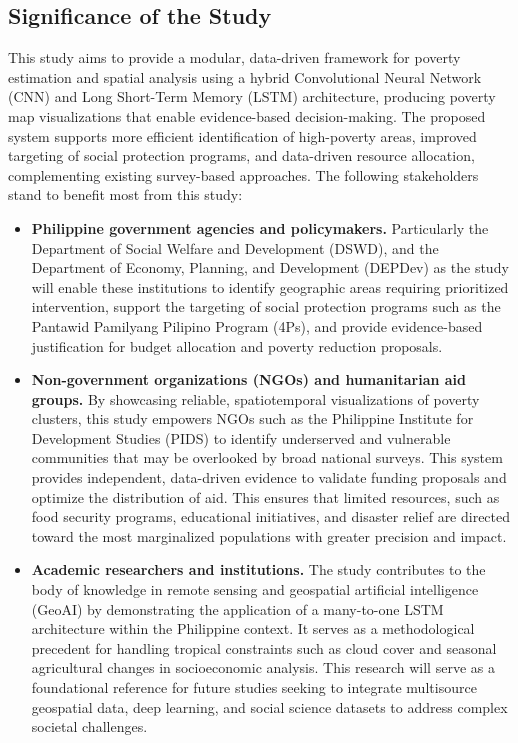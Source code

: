 \documentclass[12pt, letterpaper]{article}
\numberwithin{figure}{section}
\numberwithin{table}{section}
\begin{document}
\subsection{Significance of the Study}
This study aims to provide a modular, data-driven framework for
poverty estimation and spatial analysis using a hybrid Convolutional
Neural Network (CNN) and Long Short-Term Memory (LSTM) architecture,
producing poverty map visualizations that enable evidence-based
decision-making. The proposed system supports more efficient
identification of high-poverty areas, improved targeting of social
protection programs, and data-driven resource allocation,
complementing existing survey-based approaches. The following
stakeholders stand to benefit most from this study:
\begin{itemize}
  \item \textbf{Philippine government agencies and policymakers.}
    Particularly the Department of Social Welfare and Development
    (DSWD), and the Department of Economy, Planning, and Development
    (DEPDev) as the study will enable these institutions to identify
    geographic areas requiring prioritized intervention, support the
    targeting of social protection programs such as the Pantawid
    Pamilyang Pilipino Program (4Ps), and provide evidence-based
    justification for budget allocation and poverty reduction proposals.
  \item \textbf{Non-government organizations (NGOs) and humanitarian
    aid groups.} By showcasing reliable, spatiotemporal
    visualizations of poverty clusters, this study empowers NGOs such
    as the Philippine Institute for Development Studies (PIDS) to
    identify underserved and vulnerable communities that may be
    overlooked by broad national surveys. This system provides
    independent, data-driven evidence to validate funding proposals
    and optimize the distribution of aid. This ensures that limited
    resources, such as food security programs, educational
    initiatives, and disaster relief are directed toward the most
    marginalized populations with greater precision and impact.
  \item \textbf{Academic researchers and institutions.} The study
    contributes to the body of knowledge in remote sensing and
    geospatial artificial intelligence (GeoAI) by demonstrating the
    application of a many-to-one LSTM architecture within the
    Philippine context. It serves as a methodological precedent for
    handling tropical constraints such as cloud cover and seasonal
    agricultural changes in socioeconomic analysis. This research
    will serve as a foundational reference for future studies seeking
    to integrate multisource geospatial data, deep learning, and
    social science datasets to address complex societal challenges.
\end{itemize}
\end{document}
